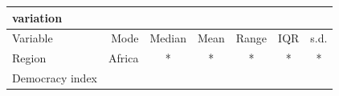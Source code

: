 \documentclass[11pt,a4paper,openany]{book}
\begin{document}
\begin{longtable}[]{@{}lrccccc@{}}
\begin{minipage}[b]{0.09\columnwidth}
variation\strut
\end{minipage}\tabularnewline
\midrule
\endhead
\begin{minipage}[t]{0.12\columnwidth}\raggedright\strut
Variable\strut
\end{minipage} & \begin{minipage}[t]{0.11\columnwidth}\raggedleft\strut
Mode\strut
\end{minipage} & \begin{minipage}[t]{0.23\columnwidth}\centering\strut
Median\strut
\end{minipage} & \begin{minipage}[t]{0.09\columnwidth}\centering\strut
Mean\strut
\end{minipage} & \begin{minipage}[t]{0.09\columnwidth}\centering\strut
Range\strut
\end{minipage} & \begin{minipage}[t]{0.08\columnwidth}\centering\strut
IQR\strut
\end{minipage} & \begin{minipage}[t]{0.09\columnwidth}\centering\strut
s.d.\strut
\end{minipage}\tabularnewline
\begin{minipage}[t]{0.12\columnwidth}\raggedright\strut
Region\strut
\end{minipage} & \begin{minipage}[t]{0.11\columnwidth}\raggedleft\strut
Africa\strut
\end{minipage} & \begin{minipage}[t]{0.23\columnwidth}\centering\strut
*\strut
\end{minipage} & \begin{minipage}[t]{0.09\columnwidth}\centering\strut
*\strut
\end{minipage} & \begin{minipage}[t]{0.09\columnwidth}\centering\strut
*\strut
\end{minipage} & \begin{minipage}[t]{0.08\columnwidth}\centering\strut
*\strut
\end{minipage} & \begin{minipage}[t]{0.09\columnwidth}\centering\strut
*\strut
\end{minipage}\tabularnewline
\begin{minipage}[t]{0.12\columnwidth}\raggedright\strut
Democracy index\strut
\end{minipage} & \begin{minipage}[t]{0.11\columnwidth}\raggedleft\strut

\end{minipage}
\end{longtable}
\end{document}
